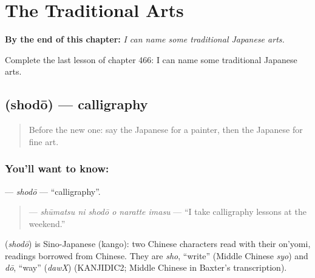 
\chapter{The Traditional Arts}
\label{ch:ja-the-traditional-arts}

\begin{chapteropening}
\textbf{By the end of this chapter:} \emph{I can name some traditional Japanese arts.}

Complete the last lesson of chapter 466: I can name some traditional Japanese arts.
\end{chapteropening}

\section[\texorpdfstring{\ja{しょどう} (shodō)}{しょどう (shodō)}]{ (shodō) — calligraphy}

\label{lesson:JA-C466-shodou}



\begin{quote}
Before the new one: say the Japanese for a painter, then the Japanese for fine art.
\end{quote}

\subsection*{You'll want to know: }
\textbf{} — \emph{shodō} — \textquotedblleft{}calligraphy\textquotedblright{}.

\begin{quote}
\textbf{  } — \emph{shūmatsu ni shodō o naratte imasu} — \textquotedblleft{}I take calligraphy lessons at the weekend.\textquotedblright{}
\end{quote}

\begin{cousinweb}
\textbf{} (\emph{shodō}) is Sino-Japanese (kango): two Chinese characters read with their on'yomi, readings borrowed from Chinese. They are \emph{sho}, \textquotedblleft{}write\textquotedblright{} (Middle Chinese \emph{syo}) and \emph{dō}, \textquotedblleft{}way\textquotedblright{} (\emph{dawX}) (KANJIDIC2; Middle Chinese in Baxter's transcription).
\end{cousinweb}


